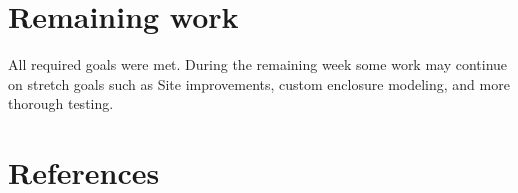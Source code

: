 \documentclass[onecolumn, draftclsnofoot,10pt, compsoc]{IEEEtran}
\begin{document}
	\section{Remaining work}
	All required goals were met.
	During the remaining week some work may continue on stretch goals such as Site improvements, custom enclosure modeling, and more thorough testing.


	\section{References}
			\begingroup
				\renewcommand{\addcontentsline}[3]{}%
				\renewcommand{\section}[2]{}%
				
				
			\endgroup
\end{document}
